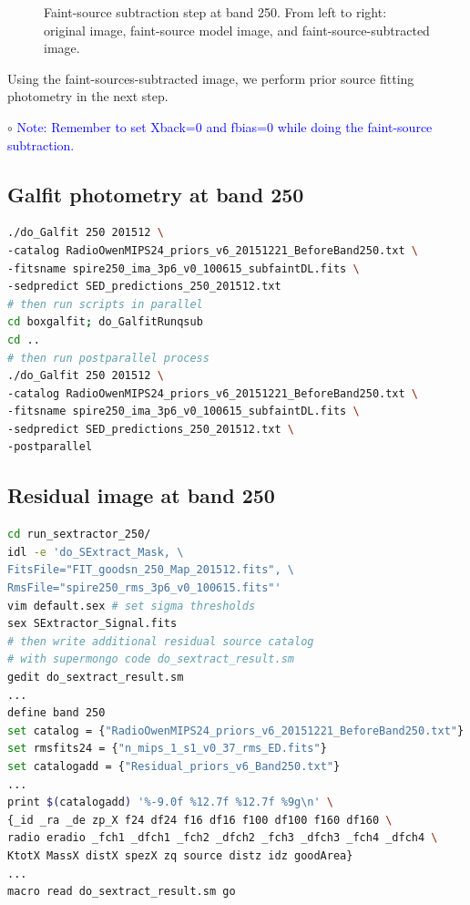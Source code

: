 \documentclass[11pt,a4paper]{article}
\begin{document}
\begin{figure}[H]
	\caption{Faint-source subtraction step at band 250. From left to right: original image, faint-source model image, and faint-source-subtracted image.}
\end{figure}

Using the faint-sources-subtracted image, we perform prior source fitting photometry in the next step. 

\indent\hspace{15pt}$\circ$ 
\textcolor{blue}{Note: Remember to set Xback=0 and fbias=0 while doing the faint-source subtraction.}
\\

\subsection{Galfit photometry at band 250}
\label{Band250_Galfit}

\begin{lstlisting}[language=bash]
./do_Galfit 250 201512 \
-catalog RadioOwenMIPS24_priors_v6_20151221_BeforeBand250.txt \
-fitsname spire250_ima_3p6_v0_100615_subfaintDL.fits \
-sedpredict SED_predictions_250_201512.txt
# then run scripts in parallel 
cd boxgalfit; do_GalfitRunqsub
cd ..
# then run postparallel process
./do_Galfit 250 201512 \
-catalog RadioOwenMIPS24_priors_v6_20151221_BeforeBand250.txt \
-fitsname spire250_ima_3p6_v0_100615_subfaintDL.fits \
-sedpredict SED_predictions_250_201512.txt \
-postparallel
\end{lstlisting}

\subsection{Residual image at band 250}
\label{Band250_Galres}

\begin{lstlisting}[language=bash]
cd run_sextractor_250/
idl -e 'do_SExtract_Mask, \
FitsFile="FIT_goodsn_250_Map_201512.fits", \
RmsFile="spire250_rms_3p6_v0_100615.fits"'
vim default.sex # set sigma thresholds
sex SExtractor_Signal.fits
# then write additional residual source catalog
# with supermongo code do_sextract_result.sm
gedit do_sextract_result.sm
...
define band 250
set catalog = {"RadioOwenMIPS24_priors_v6_20151221_BeforeBand250.txt"}
set rmsfits24 = {"n_mips_1_s1_v0_37_rms_ED.fits"}
set catalogadd = {"Residual_priors_v6_Band250.txt"}
...
print $(catalogadd) '%-9.0f %12.7f %12.7f %9g\n' \
{_id _ra _de zp_X f24 df24 f16 df16 f100 df100 f160 df160 \
radio eradio _fch1 _dfch1 _fch2 _dfch2 _fch3 _dfch3 _fch4 _dfch4 \
KtotX MassX distX spezX zq source distz idz goodArea}
...
macro read do_sextract_result.sm go
\end{lstlisting}
\end{document}

